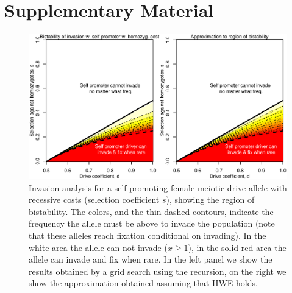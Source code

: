 \documentclass[12pt,letterpaper]{article}
\newcommand{\gc}[1]{{ \color{red} #1}}
\begin{document}



\section*{Supplementary Material}


\begin{figure}

\includegraphics[width = 0.5
          \textwidth]{../Scripts/homozyg_bistability.eps}
\caption{Invasion analysis for a self-promoting female meiotic drive allele with
  recessive costs (selection coefficient $s$), showing the region of
  bistability. The colors, and the thin dashed contours, indicate the
  frequency the allele must be above to invade the population (note
  that these alleles reach fixation conditional on invading). In the
  white area the allele can not invade ($x \geq1$), in the solid red
  area the allele can invade and fix when rare. In the left panel we
  show the results obtained by a grid search using the recursion, on
  the right we show the approximation obtained assuming that HWE
  holds. }  
\label{Bistab_homozyg_cost_fig}
\end{figure}
\end{document}
